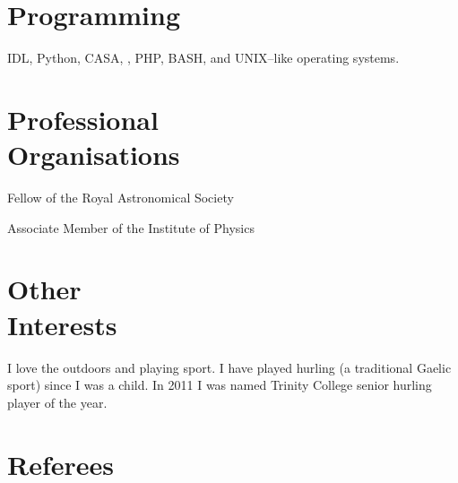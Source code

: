\documentclass[margin,line]{resume}
\begin{document}
\begin{resume}
    \section{\mysidestyle Programming} 

    IDL, Python, CASA, \LaTeXe, PHP, BASH, and UNIX--like operating systems.


    \section{\mysidestyle Professional\\Organisations} 
	\begin{list2}
    \item Fellow of the Royal Astronomical Society
    \item Associate Member of the Institute of Physics \vspace{-1mm}\\%
    \end{list2}
    
    \section{\mysidestyle Other\\Interests} 
    
	I love the outdoors and playing sport. I have played hurling (a traditional Gaelic sport) since I was a child. In 2011 I was named Trinity College senior hurling player of the year.

    
     


\section{\mysidestyle Referees} 


\end{resume}
\end{document}
